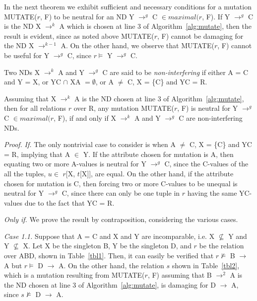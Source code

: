 \medskip

In the next theorem we exhibit sufficient and necessary conditions 
for a mutation MUTATE($r$, F) to be neutral 
for an ND Y $\to^g$ C $\in maximal(r$, F). If Y $\to^g$ C is the ND 
X $\to^k$ A which is chosen at line 3 of Algorithm~\ref{alg:mutate},
then the result is evident, since as noted above MUTATE($r$, F) 
cannot be damaging for the ND X $\to^{k-1}$ A.
On the other hand, we observe that MUTATE($r$, F) cannot be useful 
for Y $\to^g$ C, since $r \models$ Y $\to^g$ C.


\begin{definition}
\begin{rm}
Two NDs X $\to^k$ A and Y $\to^g$ C are said to be {\em non-interfering} if 
either A = C and Y = X, or YC $\cap$ XA $= \emptyset$, 
or A $\not=$ C, X = \{C\} and YC = R.
\end{rm}
\end{definition}
\medskip

\begin{theorem}\label{theorem:neutral}
\begin{rm}
Assuming that X $\to^k$ A is the ND chosen at line 3 of 
Algorithm~\ref{alg:mutate}, then for all relations $r$ over R,
any mutation MUTATE($r$, F) is neutral for Y $\to^g$ C $\in maximal(r$, F),
if and only if X $\to^k$ A and Y $\to^g$ C are non-interfering NDs.
\end{rm}
\end{theorem}
{\em Proof.} 
{\em If.} 
The only nontrivial case to consider is when A $\not=$ C, X = \{C\} and YC = R,
implying that A $\in$ Y. If the attribute chosen for mutation is A,
then equating two or more A-values is neutral for Y $\to^g$ C, since the 
C-values of the all the tuples, $u \in$ $r$[X, $t$[X]], are equal. 
On the other hand, if the attribute chosen for mutation is C, 
then forcing two or more C-values to be unequal is neutral for Y $\to^g$ C, 
since there can only be one tuple in $r$ having the same YC-values
due to the fact that YC = R.

\medskip

{\em Only if.} 
We prove the result by contraposition, considering the various cases.

\smallskip

{\em Case 1.1.}
Suppose that A = C and X and Y are incomparable,
i.e.  X $\not\subseteq$ Y and Y $\not\subseteq$ X.
Let X be the singleton B, Y be the singleton D,
and $r$ be the relation over ABD, shown in Table~\ref{tbl1}.
Then, it can easily be verified that 
$r \not\models$ B $\to$ A but $r \models$ D $\to$ A.
On the other hand, the relation $s$ shown in Table~\ref{tbl2},
which is a mutation resulting from MUTATE($r$, F) assuming that 
B $\to^2$ A is the ND chosen at line 3 of Algorithm~\ref{alg:mutate},
is damaging for D $\to$ A, since $s \not\models$ D $\to$ A.

